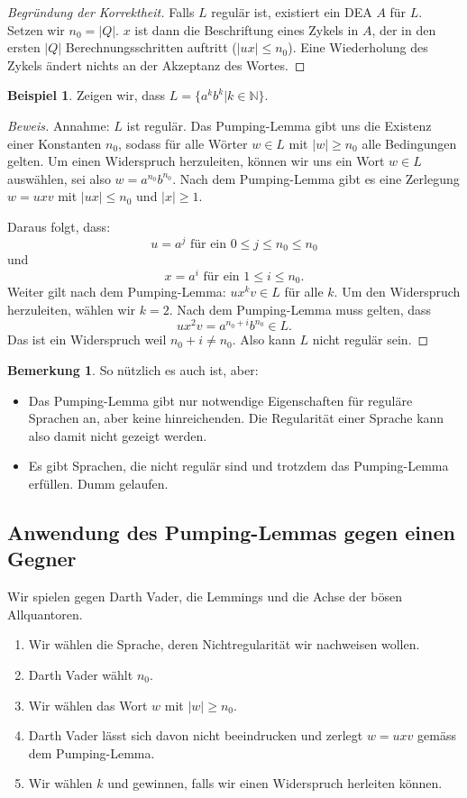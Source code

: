 \documentclass[11pt]{article} %
\theoremstyle{definition}
\newtheorem*{beispiel}{Beispiel}
\newtheorem*{bemerkung}{Bemerkung}
\begin{document}
\begin{proof}[Begründung der Korrektheit]
Falls $L$ regulär ist, existiert ein DEA $A$ für $L$. Setzen wir $n_0 = |Q|$. $x$ ist dann die Beschriftung eines Zykels in $A$, der in den ersten $|Q|$ Berechnungsschritten auftritt ($|ux| \le n_0$). Eine Wiederholung des Zykels ändert nichts an der Akzeptanz des Wortes.
\end{proof}

\begin{beispiel}
Zeigen wir, dass $L = \{a^kb^k | k \in \mathbb{N} \}$.
\end{beispiel}
\begin{proof}[Beweis]
Annahme: $L$ ist regulär. Das Pumping-Lemma gibt uns die Existenz einer Konstanten $n_0$, sodass für alle Wörter $w \in L$ mit $|w| \ge n_0$ alle Bedingungen gelten.
Um einen Widerspruch herzuleiten, können wir uns ein Wort $w \in L$ auswählen, sei also $w = a^{n_0}b^{n_0}$. Nach dem Pumping-Lemma gibt es eine Zerlegung $w = uxv$ mit $|ux| \le n_0$ und $|x| \ge 1$.

Daraus folgt, dass:
\[
u = a^j \textrm{ für ein } 0 \le j \le n_0 \le n_0
\]
und
\[
x = a^i \textrm{ für ein } 1 \le i \le n_0.
\]
Weiter gilt nach dem Pumping-Lemma: $ux^kv \in L$ für alle $k$.
Um den Widerspruch herzuleiten, wählen wir $k = 2$. Nach dem Pumping-Lemma muss gelten, dass
\[
ux^2v = a^{n_0 + i}b^{n_0} \in L.
\]
Das ist ein Widerspruch weil $n_0 + i \neq n_0$. Also kann $L$ nicht regulär sein.
\end{proof}

\begin{bemerkung}
So nützlich es auch ist, aber:
\begin{itemize}
\item Das Pumping-Lemma gibt nur notwendige Eigenschaften für reguläre Sprachen an, aber keine hinreichenden. Die Regularität einer Sprache kann also damit nicht gezeigt werden.
\item Es gibt Sprachen, die nicht regulär sind und trotzdem das Pumping-Lemma erfüllen. Dumm gelaufen.

\end{itemize}
\end{bemerkung}

\subsection{Anwendung des Pumping-Lemmas gegen einen Gegner}

Wir spielen gegen Darth Vader, die Lemmings und die Achse der bösen Allquantoren.
\begin{enumerate}
\item Wir wählen die Sprache, deren Nichtregularität wir nachweisen wollen.
\item Darth Vader wählt $n_0$.
\item Wir wählen das Wort $w$ mit $|w| \ge n_0$.
\item Darth Vader lässt sich davon nicht beeindrucken und zerlegt $w = uxv$ gemäss dem Pumping-Lemma.
\item Wir wählen $k$ und gewinnen, falls wir einen Widerspruch herleiten können.
\end{enumerate}
\end{document}
